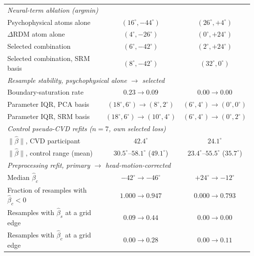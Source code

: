 \begin{table}[htbp]
\begin{tabular}{lcc}
    \multicolumn{3}{l}{\emph{Neural-term ablation (argmin)}} \\
    \quad Psychophysical atoms alone & $(16^\circ, -44^\circ)$ & $(26^\circ, +4^\circ)$ \\
    \quad $\Delta$RDM atom alone & $(4^\circ, -26^\circ)$ & $(0^\circ, +24^\circ)$ \\
    \quad Selected combination & $(6^\circ, -42^\circ)$ & $(2^\circ, +24^\circ)$ \\
    \quad Selected combination, SRM basis & $(8^\circ, -42^\circ)$ & $(32^\circ, 0^\circ)$ \\ \midrule
    \multicolumn{3}{l}{\emph{Resample stability, psychophysical alone $\rightarrow$ selected}} \\
    \quad Boundary-saturation rate & $0.23 \rightarrow 0.09$ & $0.00 \rightarrow 0.00$ \\
    \quad Parameter IQR, PCA basis & $(18^\circ, 6^\circ) \rightarrow (8^\circ, 2^\circ)$ & $(6^\circ, 4^\circ) \rightarrow (0^\circ, 0^\circ)$ \\
    \quad Parameter IQR, SRM basis & $(18^\circ, 6^\circ) \rightarrow (10^\circ, 4^\circ)$ & $(6^\circ, 4^\circ) \rightarrow (0^\circ, 2^\circ)$ \\ \midrule
    \multicolumn{3}{l}{\emph{Control pseudo-CVD refits ($n = 7$, own selected loss)}} \\
    \quad $\|\hat\beta\|$, CVD participant & $42.4^\circ$ & $24.1^\circ$ \\
    \quad $\|\hat\beta\|$, control range (mean) & $30.5^\circ$--$58.1^\circ$ ($49.1^\circ$) & $23.4^\circ$--$55.5^\circ$ ($35.7^\circ$) \\ \midrule
    \multicolumn{3}{l}{\emph{Preprocessing refit, primary $\rightarrow$ head-motion-corrected}} \\
    \quad Median $\hat\beta_c$ & $-42^\circ \rightarrow -46^\circ$ & $+24^\circ \rightarrow -12^\circ$ \\
    \quad Fraction of resamples with $\hat\beta_c < 0$ & $1.000 \rightarrow 0.947$ & $0.000 \rightarrow 0.793$ \\
    \quad Resamples with $\hat\beta_s$ at a grid edge & $0.09 \rightarrow 0.44$ & $0.00 \rightarrow 0.00$ \\
    \quad Resamples with $\hat\beta_c$ at a grid edge & $0.00 \rightarrow 0.28$ & $0.00 \rightarrow 0.11$ \\
    \bottomrule
  \end{tabular}
\end{table}

